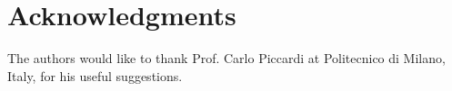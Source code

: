 \documentclass[runningheads]{llncs}
\begin{document}
    
    
    
    
    

     
     
    
    \section*{Acknowledgments}
    The authors would like to thank Prof. Carlo Piccardi at Politecnico di Milano, Italy, for his useful suggestions.

    \footnotesize
\end{document}

